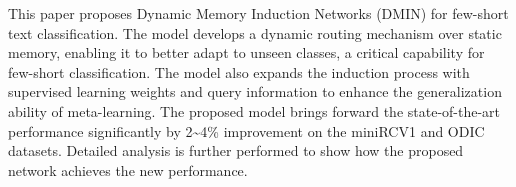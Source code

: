 This paper proposes Dynamic Memory Induction Networks (DMIN) for few-short text classification. The model develops a dynamic routing mechanism over static memory, enabling it to better adapt to unseen classes, a critical capability for few-short classification. The model also expands the induction process with supervised learning weights and query information to enhance the generalization ability of meta-learning. The proposed model brings forward the state-of-the-art performance significantly by 2{\textasciitilde}4\% improvement on the miniRCV1 and ODIC datasets. Detailed analysis is further performed to show how the proposed network achieves the new performance.
